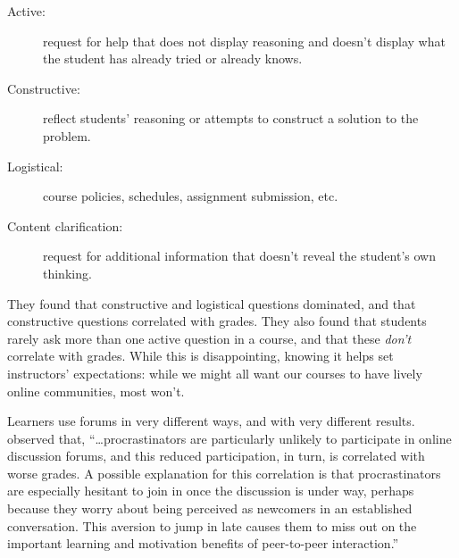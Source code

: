 \begin{description}

\item[Active:] request for help that does not display reasoning and
  doesn't display what the student has already tried or already knows.

\item[Constructive:] reflect students' reasoning or attempts to
  construct a solution to the problem.

\item[Logistical:] course policies, schedules, assignment submission,
  etc.

\item[Content clarification:] request for additional information that
  doesn't reveal the student's own thinking.

\end{description}

They found that constructive and logistical questions dominated, and
that constructive questions correlated with grades.  They also found
that students rarely ask more than one active question in a course,
and that these \emph{don't} correlate with grades.  While this is
disappointing, knowing it helps set instructors' expectations: while
we might all want our courses to have lively online communities, most
won't.

Learners use forums in very different ways, and with very different
results. \cite{Mill2016a} observed that, ``{\ldots}procrastinators are
particularly unlikely to participate in online discussion forums, and
this reduced participation, in turn, is correlated with worse
grades. A possible explanation for this correlation is that
procrastinators are especially hesitant to join in once the discussion
is under way, perhaps because they worry about being perceived as
newcomers in an established conversation. This aversion to jump in
late causes them to miss out on the important learning and motivation
benefits of peer-to-peer interaction.''

\newpage %

